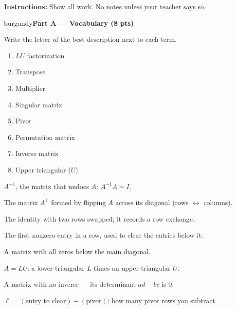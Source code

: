 \documentclass[10pt]{article}
\newcommand{\parthead}[1]{%
  \vspace{6pt}\noindent
  \begin{headlinebox}{burgundy}{\color{white}\bfseries #1}\end{headlinebox}%
  \vspace{4pt}}
\begin{document}
\namedateperiod

\vspace{0.06in}
\noindent\textbf{Instructions:} Show all work. No notes unless your teacher says so.

\parthead{Part A --- Vocabulary (8 pts)}
Write the letter of the best description next to each term.

\vspace{4pt}
\noindent
\begin{minipage}[t]{0.44\textwidth}
\begin{enumerate}[leftmargin=2.2em, itemsep=7pt, label=\arabic*.]
  \item $LU$ factorization 
  \item Transpose 
  \item Multiplier 
  \item Singular matrix 
  \item Pivot 
  \item Permutation matrix 
  \item Inverse matrix 
  \item Upper triangular ($U$) 
\end{enumerate}
\end{minipage}%
\hfill
\begin{minipage}[t]{0.53\textwidth}
\small
\begin{description}[leftmargin=1.4em, itemsep=3pt]
  \item[(A)] $A^{-1}$, the matrix that undoes $A$: $A^{-1}A=I$.
  \item[(B)] The matrix $A^{\mathsf T}$ formed by flipping $A$ across its diagonal (rows $\leftrightarrow$ columns).
  \item[(C)] The identity with two rows swapped; it records a row exchange.
  \item[(D)] The first nonzero entry in a row, used to clear the entries below it.
  \item[(E)] A matrix with all zeros below the main diagonal.
  \item[(F)] $A=LU$: a lower-triangular $L$ times an upper-triangular $U$.
  \item[(G)] A matrix with no inverse --- its determinant $ad-bc$ is $0$.
  \item[(H)] $\ell=(\text{entry to clear})\div(\text{pivot})$; how many pivot rows you subtract.
\end{description}
\end{minipage}
\end{document}
